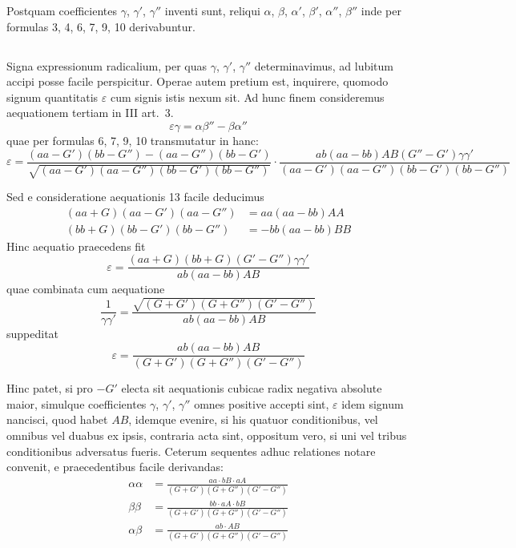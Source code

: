 \documentclass[12pt,a4paper]{article}
\begin{document}
Postquam coefficientes $\gamma$, $\gamma'$, $\gamma''$ inventi sunt, reliqui $\alpha$, $\beta$, $\alpha'$, $\beta'$, $\alpha''$, $\beta''$ inde per formulas 3, 4, 6, 7, 9, 10 derivabuntur.

\setcounter{subsection}{8}
\subsection{}

Signa expressionum radicalium, per quas $\gamma$, $\gamma'$, $\gamma''$ determinavimus, ad lubitum accipi posse facile perspicitur.
Operae autem pretium est, inquirere, quomodo signum quantitatis $\varepsilon$ cum signis istis nexum sit. Ad hunc finem consideremus aequationem tertiam in III art.~3.
\[
\varepsilon\gamma = \alpha\beta'' - \beta\alpha''
\]
quae per formulas 6, 7, 9, 10 transmutatur in hanc:
\[
\varepsilon = \frac{(aa-G')(bb-G'')-(aa-G'')(bb-G')}{\sqrt{(aa-G')(aa-G'')(bb-G')(bb-G'')}}
\cdot\frac{ab(aa-bb)AB(G''-G')\gamma\gamma'}{(aa-G')(aa-G'')(bb-G')(bb-G'')}
\]

Sed e consideratione aequationis 13 facile deducimus
\[
\begin{aligned}
(aa+G)(aa-G')(aa-G'') &= aa(aa-bb)AA \\
(bb+G)(bb-G')(bb-G'') &= -bb(aa-bb)BB
\end{aligned}
\]
Hinc aequatio praecedens fit
\[
\varepsilon = \frac{(aa+G)(bb+G)(G'-G'')\gamma\gamma'}{ab(aa-bb)AB}
\]
quae combinata cum aequatione
\[
\frac{1}{\gamma\gamma'} = \frac{\sqrt{(G+G')(G+G'')(G'-G'')}}{ab(aa-bb)AB}
\]
suppeditat
\[
\varepsilon = \frac{ab(aa-bb)AB}{(G+G')(G+G'')(G'-G'')}
\]

Hinc patet, si pro $-G'$ electa sit aequationis cubicae radix negativa absolute maior, simulque coefficientes $\gamma$, $\gamma'$, $\gamma''$ omnes positive accepti sint, $\varepsilon$ idem signum nancisci, quod habet $AB$, idemque evenire, si his quatuor conditionibus, vel omnibus vel duabus ex ipsis, contraria acta sint, oppositum vero, si uni vel tribus conditionibus adversatus fueris. Ceterum sequentes adhuc relationes notare convenit, e praecedentibus facile derivandas:
\[
\begin{aligned}
\alpha\alpha &= \frac{aa\cdot bB\cdot aA}{(G+G')(G+G'')(G'-G'')} \\
\beta\beta &= \frac{bb\cdot aA\cdot bB}{(G+G')(G+G'')(G'-G'')} \\
\alpha\beta &= \frac{ab\cdot AB}{(G+G')(G+G'')(G'-G'')}
\end{aligned}
\]
\end{document}
